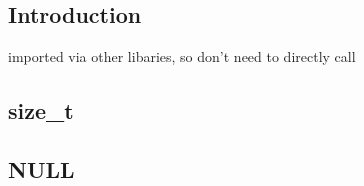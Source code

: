 
\subsection{Introduction}

imported via other libaries, so don't need to directly call


\subsection{size\_t}

\subsection{NULL}

